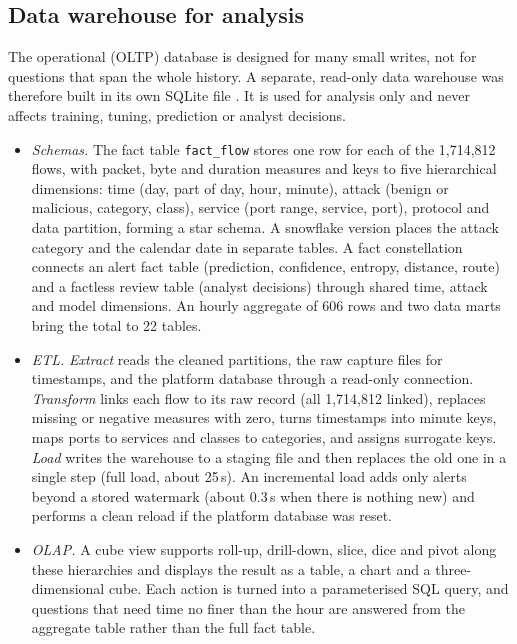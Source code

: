 \documentclass[conference]{IEEEtran}
\begin{document}
\subsection{Data warehouse for analysis}\label{sec:dw}
The operational (OLTP) database is designed for many small writes, not for questions that span the
whole history. A separate, read-only data warehouse was therefore built in its own SQLite file
\cite{chaudhuri1997overview,kimball2013toolkit}. It is used for analysis only and never affects
training, tuning, prediction or analyst decisions.
\begin{itemize}
\item \textit{Schemas.} The fact table \texttt{fact\_flow} stores one row for each of the 1,714,812
flows, with packet, byte and duration measures and keys to five hierarchical dimensions: time (day,
part of day, hour, minute), attack (benign or malicious, category, class), service (port range,
service, port), protocol and data partition, forming a star schema. A snowflake version places the
attack category and the calendar date in separate tables. A fact constellation connects an alert
fact table (prediction, confidence, entropy, distance, route) and a factless review table (analyst
decisions) through shared time, attack and model dimensions. An hourly aggregate of 606 rows and
two data marts bring the total to 22 tables.
\item \textit{ETL.} \emph{Extract} reads the cleaned partitions, the raw capture files for
timestamps, and the platform database through a read-only connection. \emph{Transform} links each
flow to its raw record (all 1,714,812 linked), replaces missing or negative measures with zero,
turns timestamps into minute keys, maps ports to services and classes to categories, and assigns
surrogate keys. \emph{Load} writes the warehouse to a staging file and then replaces the old one in a
single step (full load, about 25\,s). An incremental load adds only alerts beyond a stored watermark
(about 0.3\,s when there is nothing new) and performs a clean reload if the platform database was reset.
\item \textit{OLAP.} A cube view supports roll-up, drill-down, slice, dice and pivot along these
hierarchies and displays the result as a table, a chart and a three-dimensional cube. Each action
is turned into a parameterised SQL query, and questions that need time no finer than the hour are
answered from the aggregate table rather than the full fact table.
\end{itemize}
\end{document}
